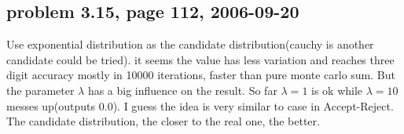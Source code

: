 \documentclass[a4paper,10pt]{article}
\begin{document}
\subsection{problem 3.15, page 112, 2006-09-20}
Use exponential distribution as the candidate distribution(cauchy is another candidate could be tried). it seems the value has less variation and reaches three digit accuracy mostly in 10000 iterations, faster than pure monte carlo sum. But the parameter $\lambda$ has a big influence on the result. So far $\lambda=1$ is ok while $\lambda=10$ messes up(outputs 0.0). I guess the idea is very similar to case in Accept-Reject. The candidate distribution, the closer to the real one, the better.
\end{document}
